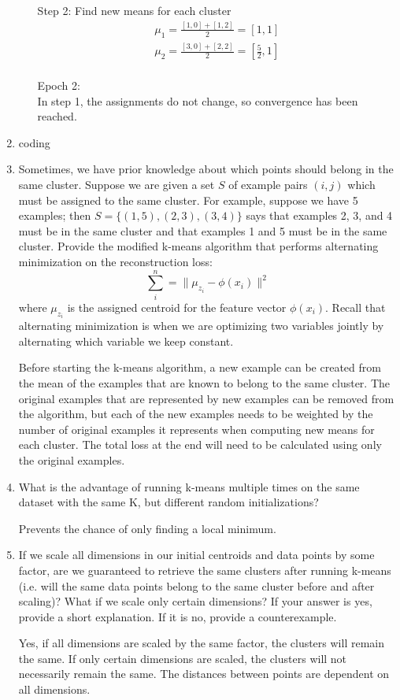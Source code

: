 \documentclass[10pt]{article}
\begin{document}
\begin{enumerate}[label=(\alph*)]
\begin{enumerate}[label=(\arabic*)]
	Step 2: Find new means for each cluster
	\begin{align*}
	\mu_1 = \frac{[1, 0] + [1, 2]}{2} = [1, 1]\\
	\mu_2 = \frac{[3, 0] + [2, 2]}{2} = [\frac{5}{2}, 1]\\
	\end{align*}
	
	Epoch 2:\\
	In step 1, the assignments do not change, so convergence has been reached.	
	
	\end{enumerate}
	
	\item coding
	
	\item Sometimes, we have prior knowledge about which points should belong in the same cluster. Suppose we are given a set $S$ of example pairs $(i,j)$ which must be assigned to the same cluster. For example, suppose we have 5 examples; then $S=\{(1,5),(2,3),(3,4)\}$ says that examples 2, 3, and 4 must be in the same cluster and that examples 1 and 5 must be in the same cluster. Provide the modified k-means algorithm that performs alternating minimization on the reconstruction loss:
$$\sum_i^n = \lVert \mu_{z_i} - \phi(x_i) \rVert^2$$
where $\mu_{z_i}$ is the assigned centroid for the feature vector $\phi(x_i)$. Recall that alternating minimization is when we are optimizing two variables jointly by alternating which variable we keep constant.

Before starting the k-means algorithm, a new example can be created from the mean of the examples that are known to belong to the same cluster. The original examples that are represented by new examples can be removed from the algorithm, but each of the new examples needs to be weighted by the number of original examples it represents when computing new means for each cluster. The total loss at the end will need to be calculated using only the original examples.

\item What is the advantage of running k-means multiple times on the same dataset with the same K, but different random initializations?

	Prevents the chance of only finding a local minimum.
	
\item If we scale all dimensions in our initial centroids and data points by some factor, are we guaranteed to retrieve the same clusters after running k-means (i.e. will the same data points belong to the same cluster before and after scaling)? What if we scale only certain dimensions? If your answer is yes, provide a short explanation. If it is no, provide a counterexample.

	Yes, if all dimensions are scaled by the same factor, the clusters will remain the same. If only certain dimensions are scaled, the clusters will not necessarily remain the same. The distances between points are dependent on all dimensions.
	
\end{enumerate}
\end{document}
